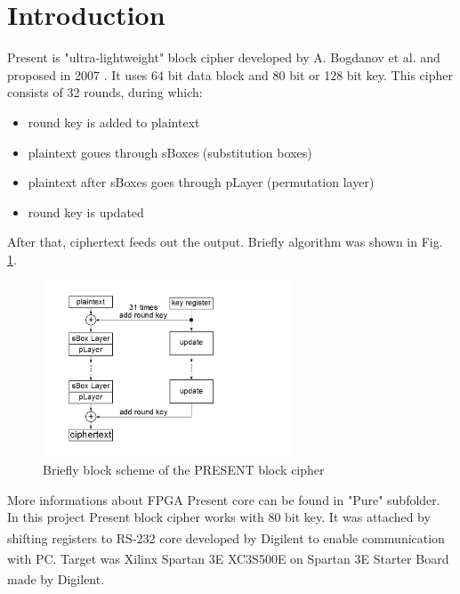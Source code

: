 \documentclass{gajewski}
\begin{document}
\maketitle

\newpage

\revisionTable

\newpage

\tableofcontents
\newpage

\section{Introduction}

Present is "ultra-lightweight" block cipher developed by A. Bogdanov et al. and proposed in 2007 \cite{PRESENT}. It uses 64 bit data block and 80 bit or 128 bit key.
This cipher consists of 32 rounds, during which: 
\begin{itemize}
    \item round key is added to plaintext
    \item plaintext goues through sBoxes (substitution boxes)
    \item plaintext after sBoxes goes through pLayer (permutation layer)
    \item round key is updated
\end{itemize}
After that, ciphertext feeds out the output. Briefly algorithm was shown in Fig. \ref{pAlgorithm}. 
\begin{figure}[!ht]%
    \begin{center}
    \includegraphics[width=0.66\textwidth]{img/presentAlgorithm.png}
    \caption{%
        Briefly block scheme of the PRESENT block cipher
     }%
    \label{pAlgorithm}
    \end{center}
 \end{figure}
More informations about FPGA Present core can be found in "Pure" subfolder.
In this project Present block cipher works with 80 bit key. It was attached by shifting registers to RS-232 core developed by Digilent\textsuperscript{\textregistered} to enable communication with PC. Target was Xilinx\textsuperscript{\textregistered} Spartan 3E XC3S500E \cite{Spartan} on Spartan 3E  Starter Board \cite{Digilent} made by Digilent\textsuperscript{\textregistered}.
\end{document}
